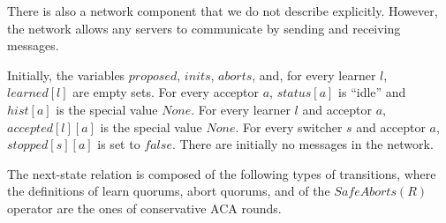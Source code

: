 There is also a network component that we do not describe explicitly.
However, the network allows any servers to communicate by sending and
receiving messages.

Initially, the variables $proposed$, $inits$, $aborts$, and, for every
learner $l$, $learned\left[ l \right]$ are empty sets. For every
acceptor $a$, $status\left[ a \right]$ is ``idle'' and $hist\left[ a
\right]$ is the special value $None$. For every learner $l$ and acceptor $a$,
$accepted\left[ l \right]\left[ a \right]$ is the special value
$None$. For every switcher $s$ and acceptor $a$, $stopped\left[ s
\right]\left[ a \right]$ is set to $false$.  There are initially no
messages in the network.

The next-state relation is composed of the following types of
transitions, where the definitions of learn quorums, abort quorums,
and of the $SafeAborts\left( R \right)$ operator are the ones of conservative
ACA rounds.
